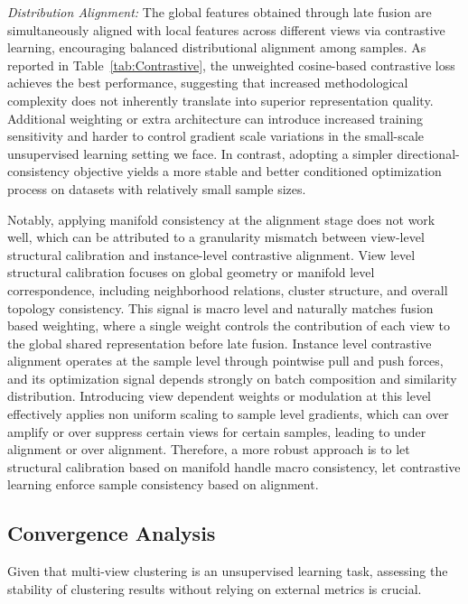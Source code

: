 \documentclass[10pt, journal, compsoc]{IEEEtran}
\begin{document}

\textcolor{c1}{\textit{Distribution Alignment:}} The global features obtained through late fusion are simultaneously aligned with local features across different views via contrastive learning, encouraging balanced distributional alignment among samples. As reported in Table~\ref{tab:Contrastive}, the unweighted cosine-based contrastive loss achieves the best performance, suggesting that increased methodological complexity does not inherently translate into superior representation quality. Additional weighting or extra architecture can introduce increased training sensitivity and harder to control gradient scale variations in the small-scale unsupervised learning setting we face. In contrast, adopting a simpler directional-consistency objective yields a more stable and better conditioned optimization process on datasets with relatively small sample sizes.

Notably, applying manifold consistency at the alignment stage does not work well, which can be attributed to a granularity mismatch between view-level structural calibration and instance-level contrastive alignment. View level structural calibration focuses on global geometry or manifold level correspondence, including neighborhood relations, cluster structure, and overall topology consistency. This signal is macro level and naturally matches fusion based weighting, where a single weight controls the contribution of each view to the global shared representation before late fusion. Instance level contrastive alignment operates at the sample level through pointwise pull and push forces, and its optimization signal depends strongly on batch composition and similarity distribution. Introducing view dependent weights or modulation at this level effectively applies non uniform scaling to sample level gradients, which can over amplify or over suppress certain views for certain samples, leading to under alignment or over alignment. Therefore, a more robust approach is to let structural calibration based on manifold handle macro consistency, let contrastive learning enforce sample consistency based on alignment.

\subsection{Convergence Analysis}

Given that multi-view clustering is an unsupervised learning task, assessing the stability of clustering results without relying on external metrics is crucial.
\end{document}
